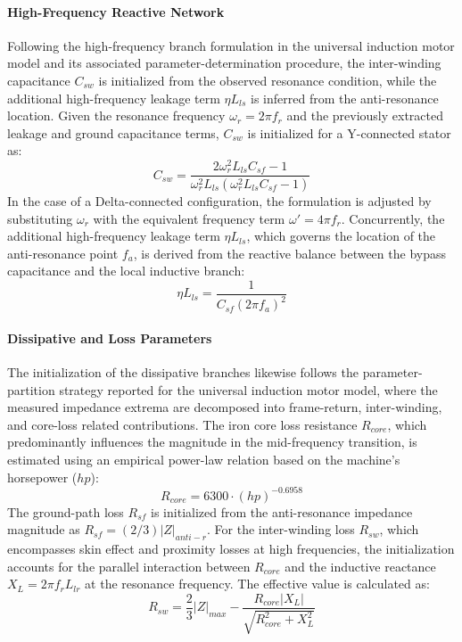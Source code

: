 \documentclass[12pt,a4paper]{article}
\begin{document}
\paragraph{High-Frequency Reactive Network}
Following the high-frequency branch formulation in the universal induction motor model and its associated parameter-determination procedure\cite{ref99,ref144}, the inter-winding capacitance $C_{sw}$ is initialized from the observed resonance condition, while the additional high-frequency leakage term $\eta L_{ls}$ is inferred from the anti-resonance location. Given the resonance frequency $\omega_r = 2\pi f_r$ and the previously extracted leakage and ground capacitance terms, $C_{sw}$ is initialized for a Y-connected stator as:
\begin{equation}
C_{sw} = \frac{2\omega_r^2 L_{ls} C_{sf} - 1}{\omega_r^2 L_{ls} (\omega_r^2 L_{ls} C_{sf} - 1)}
\end{equation}
In the case of a Delta-connected configuration, the formulation is adjusted by substituting $\omega_r$ with the equivalent frequency term $\omega' = 4\pi f_r$. Concurrently, the additional high-frequency leakage term $\eta L_{ls}$, which governs the location of the anti-resonance point $f_a$, is derived from the reactive balance between the bypass capacitance and the local inductive branch:
\begin{equation}
\eta L_{ls} = \frac{1}{C_{sf} (2\pi f_a)^2}
\end{equation}

\paragraph{Dissipative and Loss Parameters}
The initialization of the dissipative branches likewise follows the parameter-partition strategy reported for the universal induction motor model\cite{ref99,ref144}, where the measured impedance extrema are decomposed into frame-return, inter-winding, and core-loss related contributions. The iron core loss resistance $R_{core}$, which predominantly influences the magnitude in the mid-frequency transition, is estimated using an empirical power-law relation based on the machine’s horsepower ($hp$):
\begin{equation}
R_{core} = 6300 \cdot (hp)^{-0.6958}
\end{equation}
The ground-path loss $R_{sf}$ is initialized from the anti-resonance impedance magnitude as $R_{sf} = (2/3) |Z|_{anti-r}$. For the inter-winding loss $R_{sw}$, which encompasses skin effect and proximity losses at high frequencies, the initialization accounts for the parallel interaction between $R_{core}$ and the inductive reactance $X_L = 2\pi f_r L_{lr}$ at the resonance frequency. The effective value is calculated as:
\begin{equation}
R_{sw} = \frac{2}{3}|Z|_{max} - \frac{R_{core} |X_L|}{\sqrt{R_{core}^2 + X_L^2}}
\end{equation}
\end{document}
